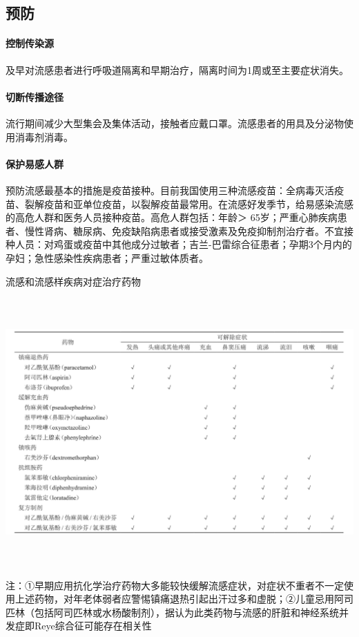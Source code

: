 \subsection{预防}

\paragraph{控制传染源}

及早对流感患者进行呼吸道隔离和早期治疗，隔离时间为1周或至主要症状消失。

\paragraph{切断传播途径}

流行期间减少大型集会及集体活动，接触者应戴口罩。流感患者的用具及分泌物使用消毒剂消毒。

\paragraph{保护易感人群}

预防流感最基本的措施是疫苗接种。目前我国使用三种流感疫苗：全病毒灭活疫苗、裂解疫苗和亚单位疫苗，以裂解疫苗最常用。在流感好发季节，给易感染流感的高危人群和医务人员接种疫苗。高危人群包括：年龄＞
65岁；严重心肺疾病患者、慢性肾病、糖尿病、免疫缺陷病患者或接受激素及免疫抑制剂治疗者。不宜接种人员：对鸡蛋或疫苗中其他成分过敏者；吉兰-巴雷综合征患者；孕期3个月内的孕妇；急性感染性疾病患者；严重过敏体质者。

\begin{table}[htbp]
\begin{center}
\caption{流感和流感样疾病对症治疗药物}
\label{tab69-1}
\includegraphics[width=6.82292in,height=4.04167in]{./images/Image00363.jpg}
\end{center}

{\small
注：①早期应用抗化学治疗药物大多能较快缓解流感症状，对症状不重者不一定使用上述药物，对年老体弱者应警惕镇痛退热引起出汗过多和虚脱；②儿童忌用阿司匹林（包括阿司匹林或水杨酸制剂），据认为此类药物与流感的肝脏和神经系统并发症即Reye综合征可能存在相关性}
\end{table}



